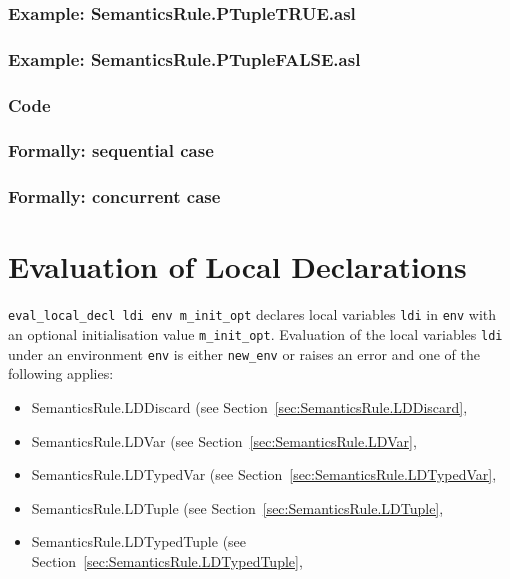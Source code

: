 \documentclass{book}
\begin{document}
    \subsection{Example: SemanticsRule.PTupleTRUE.asl}

    \subsection{Example: SemanticsRule.PTupleFALSE.asl}

  \subsection{Code}

\begin{emptyformal}
  \subsection{Formally: sequential case}

  \subsection{Formally: concurrent case}
\end{emptyformal}


\chapter{Evaluation of Local Declarations \label{chap:eval_local_decl}}

\texttt{eval\_local\_decl ldi env m\_init\_opt} declares local variables
\texttt{ldi} in \texttt{env} with an optional initialisation value
\texttt{m\_init\_opt}.  Evaluation of the local variables \texttt{ldi}
under an environment \texttt{env} is either \texttt{new\_env} or raises an
error and one of the following applies:
\begin{itemize}
\item SemanticsRule.LDDiscard (see Section~\ref{sec:SemanticsRule.LDDiscard},
\item SemanticsRule.LDVar (see Section~\ref{sec:SemanticsRule.LDVar},
\item SemanticsRule.LDTypedVar (see Section~\ref{sec:SemanticsRule.LDTypedVar},
\item SemanticsRule.LDTuple (see Section~\ref{sec:SemanticsRule.LDTuple},
\item SemanticsRule.LDTypedTuple (see Section~\ref{sec:SemanticsRule.LDTypedTuple},
\end{itemize}
\end{document}
